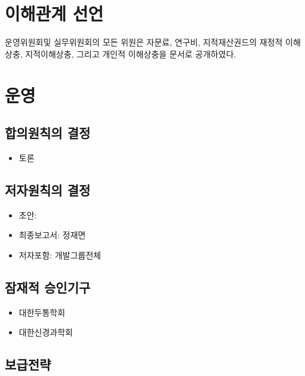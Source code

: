 \documentclass[]{book}
\providecommand{\tightlist}{%
  \setlength{\itemsep}{0pt}\setlength{\parskip}{0pt}}
\begin{document}
\hypertarget{section-5}{%
\section{이해관계 선언}\label{section-5}}

운영위원회및 실무위원회의 모든 위원은 자문료, 연구비, 지적재산권드의 재정적 이해상충, 지적이해상충, 그리고 개인적 이해상충을 문서로 공개하였다.

\hypertarget{section-6}{%
\section{운영}\label{section-6}}

\hypertarget{section-7}{%
\subsection{합의원칙의 결정}\label{section-7}}

\begin{itemize}
\tightlist
\item
  토론
\end{itemize}

\hypertarget{section-8}{%
\subsection{저자원칙의 결정}\label{section-8}}

\begin{itemize}
\tightlist
\item
  초안:
\item
  최종보고서: 정재면
\item
  저자포함: 개발그룹전체
\end{itemize}

\hypertarget{section-9}{%
\subsection{잠재적 승인기구}\label{section-9}}

\begin{itemize}
\tightlist
\item
  대한두통학회
\item
  대한신경과학회
\end{itemize}

\hypertarget{section-10}{%
\subsection{보급전략}\label{section-10}}
\end{document}
